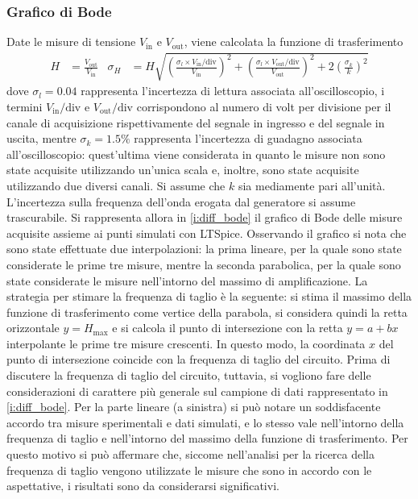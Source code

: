 \documentclass[a4paper,11pt]{article} %
\begin{document}

\subsubsection{Grafico di Bode}
Date le misure di tensione $V_{\text{in}}$ e $V_{\text{out}}$, viene calcolata la funzione di trasferimento
\begin{align}\label{e:diff_err}
	H&=\frac{V_{\text{out}}}{V_{\text{in}}} & \sigma_{H}&= H \sqrt{	
											\left(	\frac{	\sigma_{l}\times V_{\text{in}}/\text{div}	}{	V_{\text{in}}	}	\right)^2	 + 
											\left(	\frac{	\sigma_{l}\times V_{\text{out}}/\text{div}	}{	V_{\text{out}}	}	\right)^2 +	
											2\left(	\frac{	\sigma_{k}	}{	k	}	\right)^2 }	
\end{align}
\noindent dove $\sigma_{l}=0.04$ rappresenta l'incertezza di lettura associata all'oscilloscopio, i termini
$V_{\text{in}}/\text{div}$ e $V_{\text{out}}/\text{div}$ corrispondono al numero di volt per divisione per il canale di
acquisizione rispettivamente del segnale in ingresso e del segnale in uscita, mentre $\sigma_{k}=1.5\%$ rappresenta
l'incertezza di guadagno associata all'oscilloscopio: quest'ultima viene considerata in quanto le misure non sono state
acquisite utilizzando un'unica scala e, inoltre, sono state acquisite utilizzando due diversi canali. Si assume che $k$
sia mediamente pari all'unità. L'incertezza sulla frequenza dell'onda erogata dal generatore si assume trascurabile. Si
rappresenta allora in \autoref{i:diff_bode} il grafico di Bode delle misure acquisite assieme ai punti simulati con
LTSpice. Osservando il grafico si nota che sono state effettuate due interpolazioni: la prima lineare, per la quale sono
state considerate le prime tre misure, mentre la seconda parabolica, per la quale sono state considerate le misure
nell'intorno del massimo di amplificazione. La strategia per stimare la frequenza di taglio è la seguente: si stima il
massimo della funzione di trasferimento come vertice della parabola, si considera quindi la retta orizzontale
$y=H_{\text{max}}$ e si calcola il punto di intersezione con la retta $y=a+bx$ interpolante le prime tre misure
crescenti. In questo modo, la coordinata $x$ del punto di intersezione coincide con la frequenza di taglio del circuito.
Prima di discutere la frequenza di taglio del circuito, tuttavia, si vogliono fare delle considerazioni di carattere più
generale sul campione di dati rappresentato in \autoref{i:diff_bode}. Per la parte lineare (a sinistra) si può notare un
soddisfacente accordo tra misure sperimentali e dati simulati, e lo stesso vale nell'intorno della frequenza di taglio e
nell'intorno del massimo della funzione di trasferimento. Per questo motivo si può affermare che, siccome nell'analisi
per la ricerca della frequenza di taglio vengono utilizzate le misure che sono in accordo con le aspettative, i
risultati sono da considerarsi significativi.  
\end{document}

